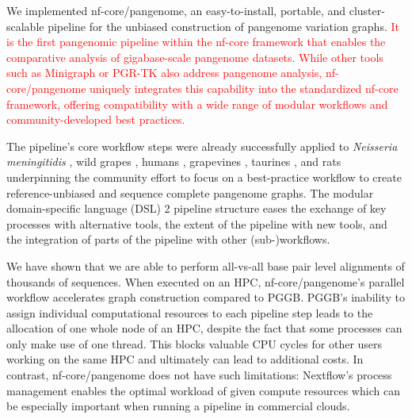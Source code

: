 \documentclass{bioinfo}
\theoremstyle{definition}
\newcommand{\red}[1]{{\textcolor{Red}{#1}}}
\begin{document}
	We implemented nf-core/pangenome, an easy-to-install, portable, and cluster-scalable pipeline for the unbiased construction of pangenome variation graphs.  
    \red{It is the first pangenomic pipeline within the nf-core framework that enables the comparative analysis of gigabase-scale pangenome datasets. 
    While other tools such as Minigraph \citep{Li:2020} or PGR-TK \citep{Chin2023} also address pangenome analysis, nf-core/pangenome uniquely integrates this capability into the standardized nf-core framework, offering compatibility with a wide range of modular workflows and community-developed best practices.}
    
	The pipeline’s core workflow steps were already successfully applied to \textit{Neisseria meningitidis} \citep{Yang2023}, wild grapes \citep{Cochetel2023}, humans \citep{Guarracino2023, Liao2023}, grapevines \citep{Guo2024}, taurines \citep{Milia2024}, and rats \citep{Villani2024} underpinning the community effort to focus on a best-practice workflow to create reference-unbiased and sequence complete pangenome graphs. 
	The modular domain-specific language (DSL) 2 pipeline structure eases the exchange of key processes with alternative tools, the extent of the pipeline with new tools, and the integration of parts of the pipeline with other (sub-)workflows.
	
	We have shown that we are able to perform all-vs-all base pair level alignments of thousands of sequences. 
	When executed on an HPC, nf-core/pangenome’s parallel workflow accelerates graph construction compared to PGGB. 
	PGGB’s inability to assign individual computational resources to each pipeline step leads to the allocation of one whole node of an HPC, despite the fact that some processes can only make use of one thread. 
	This blocks valuable CPU cycles for other users working on the same HPC and ultimately can lead to additional costs.
	In contrast, %
	nf-core/pangenome does not have such limitations: 
	Nextflow’s process management enables the optimal workload of given compute resources which can be especially important when running a pipeline in commercial clouds. %
	
\end{document}
